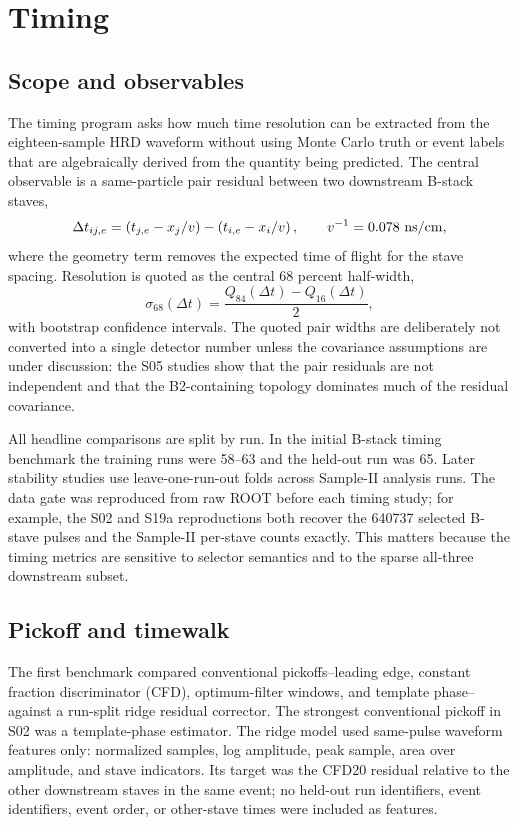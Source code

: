 \chapter{Timing}

\section{Scope and observables}

The timing program asks how much time resolution can be extracted from the
eighteen-sample HRD waveform without using Monte Carlo truth or event labels that
are algebraically derived from the quantity being predicted.  The central
observable is a same-particle pair residual between two downstream B-stack
staves,
\begin{equation}
  \Delta t_{ij,e} =
  \left(t_{j,e} - x_j/v\right) -
  \left(t_{i,e} - x_i/v\right),
  \qquad v^{-1}=0.078~{\rm ns/cm},
\end{equation}
where the geometry term removes the expected time of flight for the stave
spacing.  Resolution is quoted as the central 68 percent half-width,
\begin{equation}
  \sigma_{68}(\Delta t) =
  \frac{Q_{84}(\Delta t)-Q_{16}(\Delta t)}{2},
\end{equation}
with bootstrap confidence intervals.  The quoted pair widths are deliberately
not converted into a single detector number unless the covariance assumptions
are under discussion: the S05 studies show that the pair residuals are not
independent and that the B2-containing topology dominates much of the residual
covariance.

All headline comparisons are split by run.  In the initial B-stack timing
benchmark the training runs were 58--63 and the held-out run was 65.  Later
stability studies use leave-one-run-out folds across Sample-II analysis runs.
The data gate was reproduced from raw ROOT before each timing study; for example,
the S02 and S19a reproductions both recover the 640737 selected B-stave pulses
and the Sample-II per-stave counts exactly.  This matters because the timing
metrics are sensitive to selector semantics and to the sparse all-three
downstream subset.

\section{Pickoff and timewalk}

The first benchmark compared conventional pickoffs--leading edge, constant
fraction discriminator (CFD), optimum-filter windows, and template phase--against
a run-split ridge residual corrector.  The strongest conventional pickoff in
S02 was a template-phase estimator.  The ridge model used same-pulse waveform
features only: normalized samples, log amplitude, peak sample, area over
amplitude, and stave indicators.  Its target was the CFD20 residual relative to
the other downstream staves in the same event; no held-out run identifiers,
event identifiers, event order, or other-stave times were included as features.

